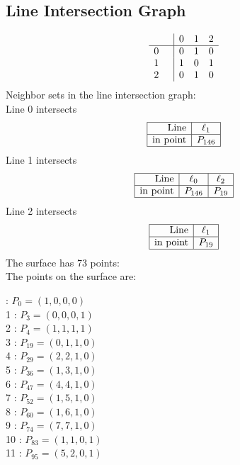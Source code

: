 \documentclass{article}
\begin{document}
{\subsection*{Line Intersection Graph}
{\arraycolsep=1pt
$$
\begin{array}{rr|*{3}r}
 &  & 0 & 1 & 2\\
\hline
0 &  & 0 & 1 & 0\\
1 &  & 1 & 0 & 1\\
2 &  & 0 & 1 & 0\\
\end{array}
$$
}%
Neighbor sets in the line intersection graph:\\
Line 0 intersects 
$$
\begin{array}{|r*{1}{|c}|}
\hline
\mbox{Line}  & \ell_{1}\\
\hline
\mbox{in point}  & P_{146}\\
\hline
\end{array}
$$
Line 1 intersects 
$$
\begin{array}{|r*{2}{|c}|}
\hline
\mbox{Line}  & \ell_{0} & \ell_{2}\\
\hline
\mbox{in point}  & P_{146} & P_{19}\\
\hline
\end{array}
$$
Line 2 intersects 
$$
\begin{array}{|r*{1}{|c}|}
\hline
\mbox{Line}  & \ell_{1}\\
\hline
\mbox{in point}  & P_{19}\\
\hline
\end{array}
$$
The surface has 73 points:\\
The points on the surface are:\\
\begin{multicols}{3}
 : $P_{0}=( 1, 0, 0, 0 )$\\
1 : $P_{3}=( 0, 0, 0, 1 )$\\
2 : $P_{4}=( 1, 1, 1, 1 )$\\
3 : $P_{19}=( 0, 1, 1, 0 )$\\
4 : $P_{29}=( 2, 2, 1, 0 )$\\
5 : $P_{36}=( 1, 3, 1, 0 )$\\
6 : $P_{47}=( 4, 4, 1, 0 )$\\
7 : $P_{52}=( 1, 5, 1, 0 )$\\
8 : $P_{60}=( 1, 6, 1, 0 )$\\
9 : $P_{74}=( 7, 7, 1, 0 )$\\
10 : $P_{83}=( 1, 1, 0, 1 )$\\
11 : $P_{95}=( 5, 2, 0, 1 )$\\

\end{multicols}}
\end{document}

